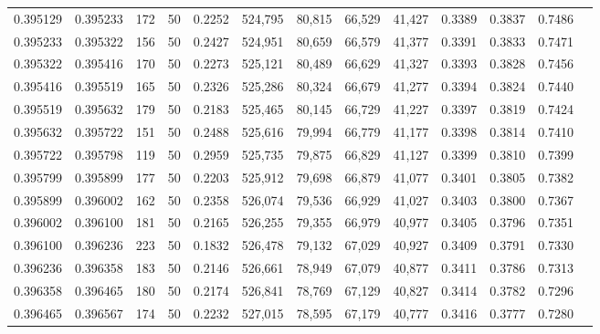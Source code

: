 \begin{tabular}{rrrrrrrrrrrrr}
0.395129 & 0.395233 &   172 &  50 &                                     0.2252 & 524,795 &  80,815 &  66,529 &  41,427 & 0.3389 & 0.3837 & 0.7486 \\
0.395233 & 0.395322 &   156 &  50 &                                     0.2427 & 524,951 &  80,659 &  66,579 &  41,377 & 0.3391 & 0.3833 & 0.7471 \\
0.395322 & 0.395416 &   170 &  50 &                                     0.2273 & 525,121 &  80,489 &  66,629 &  41,327 & 0.3393 & 0.3828 & 0.7456 \\
0.395416 & 0.395519 &   165 &  50 &                                     0.2326 & 525,286 &  80,324 &  66,679 &  41,277 & 0.3394 & 0.3824 & 0.7440 \\
0.395519 & 0.395632 &   179 &  50 &                                     0.2183 & 525,465 &  80,145 &  66,729 &  41,227 & 0.3397 & 0.3819 & 0.7424 \\
0.395632 & 0.395722 &   151 &  50 &                                     0.2488 & 525,616 &  79,994 &  66,779 &  41,177 & 0.3398 & 0.3814 & 0.7410 \\
0.395722 & 0.395798 &   119 &  50 &                                     0.2959 & 525,735 &  79,875 &  66,829 &  41,127 & 0.3399 & 0.3810 & 0.7399 \\
0.395799 & 0.395899 &   177 &  50 &                                     0.2203 & 525,912 &  79,698 &  66,879 &  41,077 & 0.3401 & 0.3805 & 0.7382 \\
0.395899 & 0.396002 &   162 &  50 &                                     0.2358 & 526,074 &  79,536 &  66,929 &  41,027 & 0.3403 & 0.3800 & 0.7367 \\
0.396002 & 0.396100 &   181 &  50 &                                     0.2165 & 526,255 &  79,355 &  66,979 &  40,977 & 0.3405 & 0.3796 & 0.7351 \\
0.396100 & 0.396236 &   223 &  50 &                                     0.1832 & 526,478 &  79,132 &  67,029 &  40,927 & 0.3409 & 0.3791 & 0.7330 \\
0.396236 & 0.396358 &   183 &  50 &                                     0.2146 & 526,661 &  78,949 &  67,079 &  40,877 & 0.3411 & 0.3786 & 0.7313 \\
0.396358 & 0.396465 &   180 &  50 &                                     0.2174 & 526,841 &  78,769 &  67,129 &  40,827 & 0.3414 & 0.3782 & 0.7296 \\
0.396465 & 0.396567 &   174 &  50 &                                     0.2232 & 527,015 &  78,595 &  67,179 &  40,777 & 0.3416 & 0.3777 & 0.7280 \\

\end{tabular}
